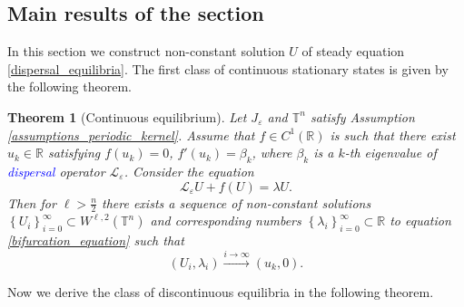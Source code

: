 \documentclass[12pt, a4paper]{article}
\theoremstyle{break}
\newtheorem{thm}{Theorem}[section]
\theoremstyle{break}
\theoremstyle{break}
\theoremstyle{break}
\theoremstyle{break}
\newcommand{\Leo}{\mathcal{L}_{\varepsilon}}
\newcommand{\Seq}[2]{\left\{#1_#2\right\}_{#2 = 0}^\infty}
\begin{document}
\subsection{Main results of the section}

In this section we construct non-constant solution $U$ of steady equation \eqref{dispersal_equilibria}. The first class of continuous stationary states is given by the following theorem.

\begin{thm}[Continuous equilibrium]
    Let $J_\varepsilon$ and $\mathbb{T}^n$ satisfy Assumption \ref{assumptions_periodic_kernel}. Assume that $f \in C^1(\mathbb{R})$ is such that there exist $u_k \in \mathbb{R}$ satisfying $f(u_k) = 0$, $f'(u_k) = \beta_k$, where $\beta_k$ is a $k$-th eigenvalue of \textcolor{blue}{dispersal} operator $\Leo$. Consider the equation
    \begin{equation}
        \Leo U + f(U) = \lambda U.
        \label{bifurcation_equation}
    \end{equation}
    Then for $\ell > \frac{n}{2}$ there exists a sequence of non-constant solutions $\Seq{U}{i} \subset W^{\ell,2}(\mathbb{T}^n)$ and corresponding numbers $\Seq{\lambda}{i} \subset \mathbb{R}$ to equation \eqref{bifurcation_equation} such that
    \begin{equation*}
        (U_i, \lambda_i) \xrightarrow{i \rightarrow \infty} (u_k, 0).
    \end{equation*}
    \label{thm:continous_ss_existence}
\end{thm}

Now we derive the class of discontinuous equilibria in the following theorem.
\end{document}
